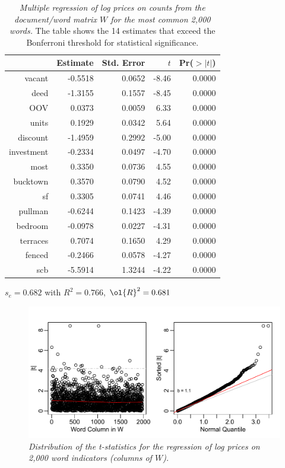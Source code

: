 \documentclass[12pt]{article}
\begin{document}
 \begin{table}
 \caption{ \label{tab:regrInd} {\sl Multiple regression of log prices on 
  counts from the document/word matrix $W$ for the most common 2,000 words.}  The table shows the 14 estimates that exceed the Bonferroni threshold for statistical significance.} 

\begin{center}
\begin{tabular}{rrrrr}
  \hline
 & Estimate & Std. Error & $t$ & Pr($>|t|$) \\ 
  \hline
  vacant & -0.5518 & 0.0652 & -8.46 & 0.0000 \\ 
  deed & -1.3155 & 0.1557 & -8.45 & 0.0000 \\ 
  OOV & 0.0373 & 0.0059 & 6.33 & 0.0000 \\ 
  units & 0.1929 & 0.0342 & 5.64 & 0.0000 \\ 
  discount & -1.4959 & 0.2992 & -5.00 & 0.0000 \\ 
  investment & -0.2334 & 0.0497 & -4.70 & 0.0000 \\ 
  most & 0.3350 & 0.0736 & 4.55 & 0.0000 \\ 
  bucktown & 0.3570 & 0.0790 & 4.52 & 0.0000 \\ 
  sf & 0.3305 & 0.0741 & 4.46 & 0.0000 \\ 
  pullman & -0.6244 & 0.1423 & -4.39 & 0.0000 \\ 
  bedroom & -0.0978 & 0.0227 & -4.31 & 0.0000 \\ 
  terraces & 0.7074 & 0.1650 & 4.29 & 0.0000 \\ 
  fenced & -0.2466 & 0.0578 & -4.27 & 0.0000 \\ 
  scb & -5.5914 & 1.3244 & -4.22 & 0.0000 \\ 
 \hline
\end{tabular}
 
    $s_e =  0.682$ with $R^2 =  0.766$, $\ol{R}^2 =  0.681$  
\end{center}
\end{table}




 \begin{figure}
  \caption{ \label{fig:regrInd} { \sl Distribution of the t-statistics for the regression of log prices on 2,000 word indicators (columns of $W$).}}
 \centerline{  \includegraphics[width=6in]{figures/tstatRegrInd}    }
 \vspace{0.2in}
 \end{figure}
\end{document}

